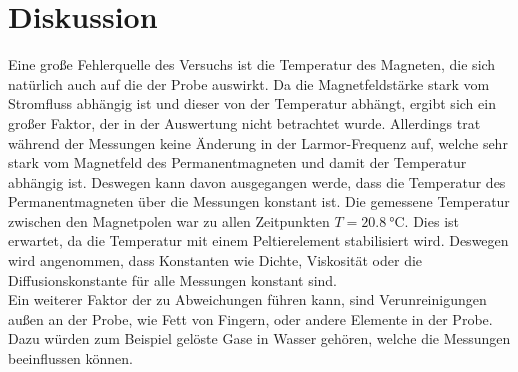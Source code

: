 \newpage
\section{Diskussion}

\noindent
Eine große Fehlerquelle des Versuchs ist die Temperatur des Magneten, die sich natürlich auch auf die der Probe auswirkt. 
Da die Magnetfeldstärke stark vom Stromfluss abhängig ist und dieser von der Temperatur abhängt, ergibt sich ein großer Faktor, der in der Auswertung nicht betrachtet wurde. 
Allerdings trat während der Messungen keine Änderung in der Larmor-Frequenz auf, welche sehr stark vom Magnetfeld des Permanentmagneten und damit der Temperatur abhängig ist.
Deswegen kann davon ausgegangen werde, dass die Temperatur des Permanentmagneten über die Messungen konstant ist.
Die gemessene Temperatur zwischen den Magnetpolen war zu allen Zeitpunkten $T= \SI{20.8}{\degreeCelsius}$. 
Dies ist erwartet, da die Temperatur mit einem Peltierelement stabilisiert wird. 
Deswegen wird angenommen, dass Konstanten wie Dichte, Viskosität oder die Diffusionskonstante für alle Messungen konstant sind.\\
Ein weiterer Faktor der zu Abweichungen führen kann, sind Verunreinigungen außen an der Probe, wie Fett von Fingern, oder andere Elemente in der Probe. 
Dazu würden zum Beispiel gelöste Gase in Wasser gehören, welche die Messungen beeinflussen können. \\\\


